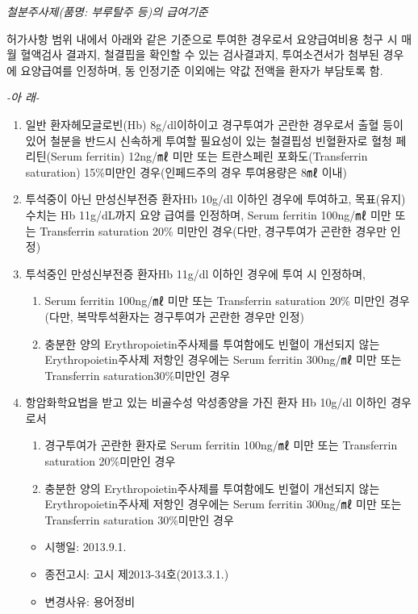 \begin{commentbox}{}
\emph{철분주사제(품명: 부루탈주 등)의 급여기준}\par
허가사항 범위 내에서 아래와 같은 기준으로 투여한 경우로서 요양급여비용 청구 시 매월 혈액검사 결과지, 철결핍을 확인할 수 있는 검사결과지, 투여소견서가 첨부된 경우에 요양급여를 인정하며, 동 인정기준 이외에는 약값 전액을 환자가 부담토록 함.\\
\begin{center}\emph{-아 래-}\end{center}
\begin{enumerate}[가)]\tightlist
\item 일반 환자헤모글로빈(Hb) 8g/dl이하이고 경구투여가 곤란한 경우로서 출혈 등이 있어 철분을 반드시 신속하게 투여할 필요성이 있는 철결핍성 빈혈환자로 혈청 페리틴(Serum ferritin) 12ng/㎖ 미만 또는 트란스페린 포화도(Transferrin saturation) 15\%미만인 경우(인페드주의 경우 투여용량은 8㎖ 이내) 
\item 투석중이 아닌 만성신부전증 환자Hb 10g/dl 이하인 경우에 투여하고, 목표(유지) 수치는 Hb 11g/dL까지 요양 급여를 인정하며, Serum ferritin 100ng/㎖ 미만 또는 Transferrin saturation 20\% 미만인 경우(다만, 경구투여가 곤란한 경우만 인정) 
\item 투석중인 만성신부전증 환자Hb 11g/dl 이하인 경우에 투여 시 인정하며,
	\begin{enumerate}[1)]\tightlist
	\item Serum ferritin 100ng/㎖ 미만 또는 Transferrin saturation 20\% 미만인 경우(다만, 복막투석환자는 경구투여가 곤란한 경우만 인정)
	\item 충분한 양의 Erythropoietin주사제를 투여함에도 빈혈이 개선되지 않는 Erythropoietin주사제 저항인 경우에는 Serum ferritin 300ng/㎖ 미만 또는 Transferrin saturation30\%미만인 경우
	\end{enumerate}
\item 항암화학요법을 받고 있는 비골수성 악성종양을 가진 환자 Hb 10g/dl 이하인 경우로서 
	\begin{enumerate}\tightlist
	\item 경구투여가 곤란한 환자로 Serum ferritin 100ng/㎖ 미만 또는 Transferrin saturation 20\%미만인 경우
	\item 충분한 양의 Erythropoietin주사제를 투여함에도 빈혈이 개선되지 않는 Erythropoietin주사제 저항인 경우에는 Serum ferritin 300ng/㎖ 미만 또는 Transferrin saturation 30\%미만인 경우
  	\end{enumerate}
	\begin{itemize}[*]\tightlist
	\item 시행일: 2013.9.1.
	\item 종전고시: 고시 제2013-34호(2013.3.1.)
	\item 변경사유: 용어정비
	\end{itemize}
\end{enumerate}


\end{commentbox}
